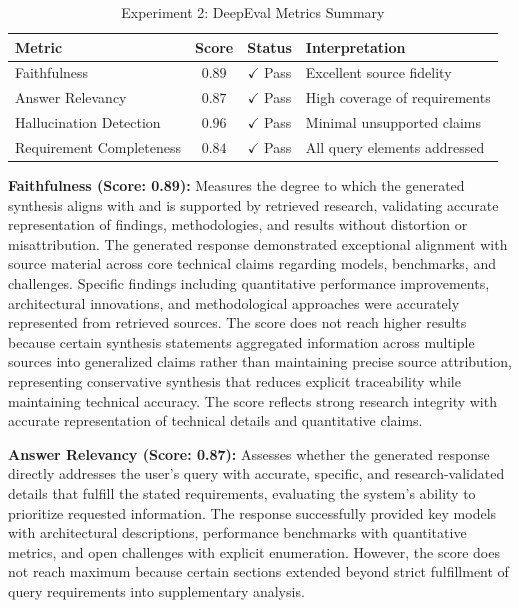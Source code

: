 \begin{table}[h]
  \centering
  \caption{Experiment 2: DeepEval Metrics Summary}
  \begin{tabular}{lccl}
    \toprule
    \textbf{Metric}          & \textbf{Score} & \textbf{Status}       & \textbf{Interpretation}       \\
    \midrule
    Faithfulness             & \( 0.89 \)     & \( \checkmark \) Pass & Excellent source fidelity     \\
    Answer Relevancy         & \( 0.87 \)     & \( \checkmark \) Pass & High coverage of requirements \\
    Hallucination Detection  & \( 0.96 \)     & \( \checkmark \) Pass & Minimal unsupported claims    \\
    Requirement Completeness & \( 0.84 \)     & \( \checkmark \) Pass & All query elements addressed  \\
    \bottomrule
  \end{tabular}
\end{table}




\textbf{Faithfulness (Score: 0.89):} Measures the degree to which the generated synthesis aligns with and is supported by retrieved research, validating accurate representation of findings, methodologies, and results without distortion or misattribution. The generated response demonstrated exceptional alignment with source material across core technical claims regarding models, benchmarks, and challenges. Specific findings including quantitative performance improvements, architectural innovations, and methodological approaches were accurately represented from retrieved sources. The score does not reach
higher results because certain synthesis statements aggregated information across multiple sources into generalized claims rather than maintaining precise source attribution, representing conservative synthesis that reduces explicit traceability while maintaining technical accuracy. The score reflects strong research integrity with accurate representation of technical details and quantitative claims.

\textbf{Answer Relevancy (Score: 0.87):} Assesses whether the generated response directly addresses the user's query with accurate, specific, and research-validated details that fulfill the stated requirements, evaluating the system's ability to prioritize requested information. The response successfully provided key models with architectural descriptions, performance benchmarks with quantitative metrics, and open challenges with explicit enumeration. However, the score does not reach maximum because certain sections extended beyond strict fulfillment of query requirements into supplementary analysis.

